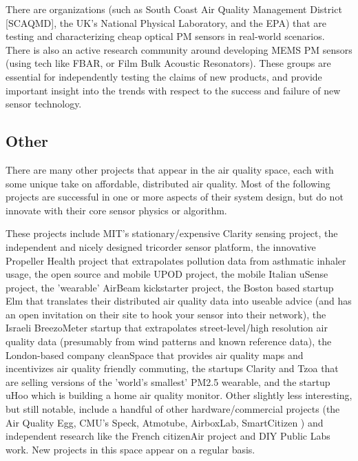 There are organizations (such as South Coast Air Quality Management District [SCAQMD], the UK's National Physical Laboratory, and the EPA) that are testing and characterizing cheap optical PM sensors in real-world scenarios. There is also an active research community around developing MEMS PM sensors (using tech like FBAR, or Film Bulk Acoustic Resonators).  These groups are essential for independently testing the claims of new products, and provide important insight into the trends with respect to the success and failure of new sensor technology.

\subsection{Other}

There are many other projects that appear in the air quality space, each with some unique take on affordable, distributed air quality.  Most of the following projects are successful in one or more aspects of their system design, but do not innovate with their core sensor physics or algorithm. 

These projects include MIT's stationary/expensive Clarity sensing project, \cite{clarity} the independent and nicely designed tricorder sensor platform, \cite{tricorder} the innovative Propeller Health project that extrapolates pollution data from asthmatic inhaler usage, \cite{propeller} the open source and mobile UPOD project, \cite{upod} the mobile Italian uSense project, \cite{usense} the 'wearable' AirBeam kickstarter project, \cite{airbeam} the Boston based startup Elm that translates their distributed air quality data into useable advice (and has an open invitation on their site to hook your sensor into their network), \cite{elm} the Israeli BreezoMeter startup that extrapolates street-level/high resolution air quality data (presumably from wind patterns and known reference data), \cite{breeze} the London-based company cleanSpace that provides air quality maps and incentivizes air quality friendly commuting, \cite{cleanspace} the startups Clarity and Tzoa that are selling versions of the 'world's smallest' PM2.5 wearable, \cite{ clarity2, tzoa} and the startup uHoo which is building a home air quality monitor. \cite{uhoo}  Other slightly less interesting, but still notable, include a handful of other hardware/commercial projects (the Air Quality Egg, \cite{egg} CMU's Speck, \cite{speck} Atmotube, \cite{atmotube} AirboxLab, \cite{airbox} SmartCitizen \cite{sck}) and independent research like the French citizenAir project \cite{citizenair} and DIY Public Labs work. \cite{publiclabs}  New projects in this space appear on a regular basis. 

